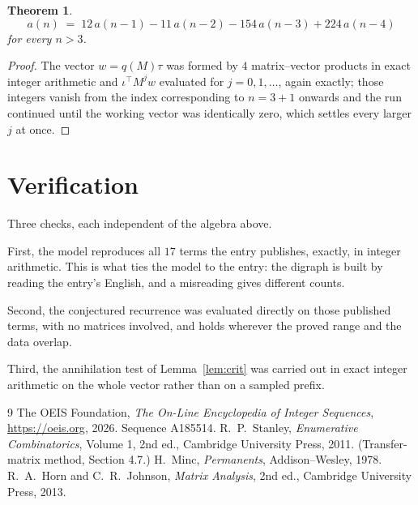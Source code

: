 \documentclass[11pt,a4paper]{article}
\theoremstyle{plain}
\newtheorem{theorem}{Theorem}
\theoremstyle{definition}
\begin{document}
\begin{theorem}
\[
a(n)\;=\;12\,a(n-1) - 11\,a(n-2) - 154\,a(n-3) + 224\,a(n-4)
\]
for every $n>3$.
\end{theorem}

\begin{proof}
The vector $w=q(M)\tau$ was formed by $4$ matrix--vector products in exact integer
arithmetic and $\iota^{\!\top}M^{j}w$ evaluated for $j=0,1,\dots$, again exactly; those
integers vanish from the index corresponding to $n=3+1$ onwards and the run continued
until the working vector was identically zero, which settles every larger $j$ at once.
\end{proof}

\section{Verification}

Three checks, each independent of the algebra above.

First, the model reproduces all $17$ terms the entry publishes, exactly, in integer
arithmetic. This is what ties the model to the entry: the digraph is built by reading the
entry's English, and a misreading gives different counts.

Second, the conjectured recurrence was evaluated directly on those published terms, with no
matrices involved, and holds wherever the proved range and the data overlap.

Third, the annihilation test of Lemma~\ref{lem:crit} was carried out in exact integer
arithmetic on the whole vector rather than on a sampled prefix.

\begin{thebibliography}{9}
 The OEIS Foundation, \emph{The On-Line Encyclopedia of Integer
Sequences}, \url{https://oeis.org}, 2026. Sequence A185514.
 R.~P.~Stanley, \emph{Enumerative Combinatorics}, Volume 1, 2nd ed.,
Cambridge University Press, 2011. (Transfer-matrix method, Section 4.7.)
 H.~Minc, \emph{Permanents}, Addison--Wesley, 1978.
 R.~A.~Horn and C.~R.~Johnson, \emph{Matrix Analysis}, 2nd ed., Cambridge
University Press, 2013.
\end{thebibliography}
\end{document}

